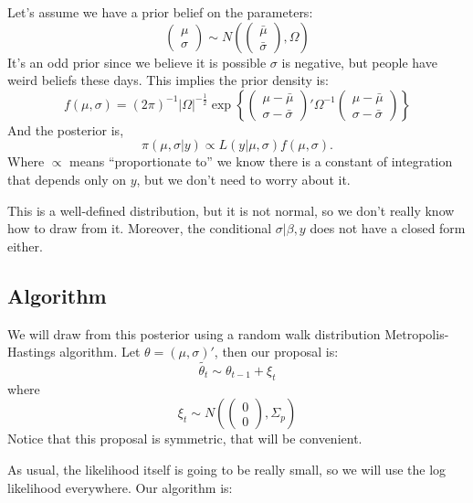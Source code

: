 \documentclass[twoside]{article}
\begin{document}
Let's assume we have a prior belief on the parameters: 
$$\begin{pmatrix} \mu  \\ \sigma \end{pmatrix} \sim N \left( \begin{pmatrix} \bar{\mu} \\ \bar{\sigma} \end{pmatrix}, \Omega \right) $$
It's an odd prior since we believe it is possible $\sigma$ is negative, but people have weird beliefs these days. This implies the prior density is: 
$$f(\mu, \sigma) = (2\pi)^{-1} | \Omega |^{-\frac{1}{2}} \exp \left \{ \begin{pmatrix} \mu - \bar{\mu} \\ \sigma - \bar{\sigma} \end{pmatrix}' \Omega^{-1} 
\begin{pmatrix} \mu - \bar{\mu} \\ \sigma - \bar{\sigma} \end{pmatrix} \right\}$$
And the posterior is, 
$$\pi(\mu, \sigma | y) \propto L(y | \mu, \sigma) f(\mu, \sigma).$$ 
Where $\propto$ means ``proportionate to'' we know there is a constant of integration that depends only on $y$, but we don't need to worry about it. 

This is a well-defined distribution, but it is not normal, so we don't really know how to draw from it. Moreover, the conditional $\sigma | \beta, y$ does
not have a closed form either. 

\subsection{Algorithm}

We will draw from this posterior using a random walk distribution Metropolis-Hastings algorithm. Let $\theta = (\mu, \sigma)'$, then our
proposal is: $$ \tilde{\theta_t} \sim \theta_{t-1} + \xi_t $$
where
$$ \xi_t \sim N \left(  \begin{pmatrix} 0\\ 0 \end{pmatrix}, \Sigma_p \right) $$
Notice that this proposal is symmetric, that will be convenient. 

As usual, the likelihood itself is going to be really small, so we will use the log likelihood everywhere. Our algorithm is: 
\end{document}
